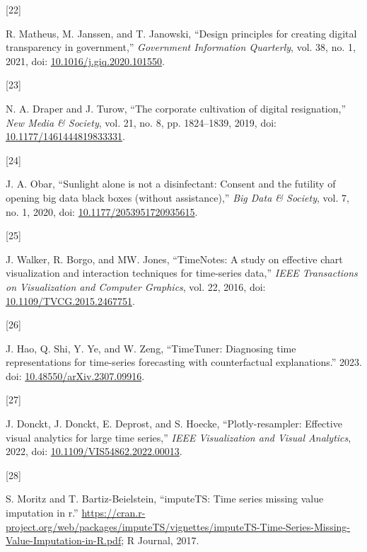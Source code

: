 \documentclass{article}
\newlength{\cslhangindent}
\newlength{\csllabelwidth}
\newlength{\cslentryspacingunit} %
\newenvironment{CSLReferences}[2] %
 {%
  \setlength{\parindent}{0pt}
  \ifodd #1
  \let\oldpar\par
  \def\par{\hangindent=\cslhangindent\oldpar}
  \fi
  \setlength{\parskip}{#2\cslentryspacingunit}
 }%
 {}
\newcommand{\CSLLeftMargin}[1]{\parbox[t]{\csllabelwidth}{#1}}
\newcommand{\CSLRightInline}[1]{\parbox[t]{\linewidth - \csllabelwidth}{#1}\break}
\begin{document}
\begin{CSLReferences}{0}{0}
\leavevmode{}%
\CSLLeftMargin{{[}22{]} }
\CSLRightInline{R. Matheus, M. Janssen, and T. Janowski, {``Design
principles for creating digital transparency in government,''}
\emph{Government Information Quarterly}, vol. 38, no. 1, 2021, doi:
\href{https://doi.org/10.1016/j.giq.2020.101550}{10.1016/j.giq.2020.101550}.}

\leavevmode{}%
\CSLLeftMargin{{[}23{]} }
\CSLRightInline{N. A. Draper and J. Turow, {``The corporate cultivation
of digital resignation,''} \emph{New Media \& Society}, vol. 21, no. 8,
pp. 1824--1839, 2019, doi:
\href{https://doi.org/10.1177/1461444819833331}{10.1177/1461444819833331}.}

\leavevmode{}%
\CSLLeftMargin{{[}24{]} }
\CSLRightInline{J. A. Obar, {``Sunlight alone is not a disinfectant:
Consent and the futility of opening big data black boxes (without
assistance),''} \emph{Big Data \& Society}, vol. 7, no. 1, 2020, doi:
\href{https://doi.org/10.1177/2053951720935615}{10.1177/2053951720935615}.}

\leavevmode{}%
\CSLLeftMargin{{[}25{]} }
\CSLRightInline{J. Walker, R. Borgo, and MW. Jones, {``TimeNotes: A
study on effective chart visualization and interaction techniques for
time-series data,''} \emph{IEEE Transactions on Visualization and
Computer Graphics}, vol. 22, 2016, doi:
\href{https://doi.org/10.1109/TVCG.2015.2467751}{10.1109/TVCG.2015.2467751}.}

\leavevmode{}%
\CSLLeftMargin{{[}26{]} }
\CSLRightInline{J. Hao, Q. Shi, Y. Ye, and W. Zeng, {``TimeTuner:
Diagnosing time representations for time-series forecasting with
counterfactual explanations.''} 2023. doi:
\href{https://doi.org/10.48550/arXiv.2307.09916}{10.48550/arXiv.2307.09916}.}

\leavevmode{}%
\CSLLeftMargin{{[}27{]} }
\CSLRightInline{J. Donckt, J. Donckt, E. Deprost, and S. Hoecke,
{``Plotly-resampler: Effective visual analytics for large time
series,''} \emph{IEEE Visualization and Visual Analytics}, 2022, doi:
\href{https://doi.org/10.1109/VIS54862.2022.00013}{10.1109/VIS54862.2022.00013}.}

\leavevmode{}%
\CSLLeftMargin{{[}28{]} }
\CSLRightInline{S. Moritz and T. Bartiz-Beielstein, {``imputeTS: Time
series missing value imputation in r.''}
\url{https://cran.r-project.org/web/packages/imputeTS/vignettes/imputeTS-Time-Series-Missing-Value-Imputation-in-R.pdf};
R Journal, 2017.}


\end{CSLReferences}
\end{document}

